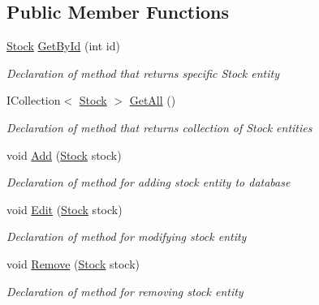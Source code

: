 \subsection*{Public Member Functions}
\begin{DoxyCompactItemize}
\item 
\mbox{\hyperlink{class_gielda_l2_1_1_d_b_1_1_entities_1_1_stock}{Stock}} \mbox{\hyperlink{interface_gielda_l2_1_1_d_b_1_1_interfaces_1_1_i_stock_repository_adceb4897529ba90f63534e22f02c5701}{Get\+By\+Id}} (int id)
\begin{DoxyCompactList}\small\item\em Declaration of method that returns specific Stock entity \end{DoxyCompactList}\item 
I\+Collection$<$ \mbox{\hyperlink{class_gielda_l2_1_1_d_b_1_1_entities_1_1_stock}{Stock}} $>$ \mbox{\hyperlink{interface_gielda_l2_1_1_d_b_1_1_interfaces_1_1_i_stock_repository_a038d11f6dd79d0b6361e16137a16f1f7}{Get\+All}} ()
\begin{DoxyCompactList}\small\item\em Declaration of method that returns collection of Stock entities \end{DoxyCompactList}\item 
void \mbox{\hyperlink{interface_gielda_l2_1_1_d_b_1_1_interfaces_1_1_i_stock_repository_a602e2dcb80b5c6e13e2db9ff57afa96b}{Add}} (\mbox{\hyperlink{class_gielda_l2_1_1_d_b_1_1_entities_1_1_stock}{Stock}} stock)
\begin{DoxyCompactList}\small\item\em Declaration of method for adding stock entity to database \end{DoxyCompactList}\item 
void \mbox{\hyperlink{interface_gielda_l2_1_1_d_b_1_1_interfaces_1_1_i_stock_repository_aa24bb25092f2082b4bdf0d5744e3127f}{Edit}} (\mbox{\hyperlink{class_gielda_l2_1_1_d_b_1_1_entities_1_1_stock}{Stock}} stock)
\begin{DoxyCompactList}\small\item\em Declaration of method for modifying stock entity \end{DoxyCompactList}\item 
void \mbox{\hyperlink{interface_gielda_l2_1_1_d_b_1_1_interfaces_1_1_i_stock_repository_af6aeb871715f10bc3a69ef381050442c}{Remove}} (\mbox{\hyperlink{class_gielda_l2_1_1_d_b_1_1_entities_1_1_stock}{Stock}} stock)
\begin{DoxyCompactList}\small\item\em Declaration of method for removing stock entity \end{DoxyCompactList}\end{DoxyCompactItemize}
